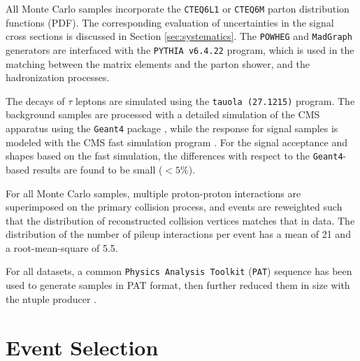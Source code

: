 All Monte Carlo samples incorporate the \texttt{CTEQ6L1} \cite{Pumplin:2002vw} or \texttt{CTEQ6M} \cite{Nadolsky:2008zw} parton distribution functions (PDF). The corresponding evaluation of uncertainties in the signal cross sections is discussed in Section \ref{sec:systematics}. The \texttt{POWHEG} and \texttt{MadGraph} generators are interfaced with the \texttt{PYTHIA v6.4.22} \cite{Sjostrand:2006za} program, which is used in the matching between the matrix elements and the parton shower, and the hadronization processes. 


The decays of $\tau$ leptons are simulated using the \texttt{tauola (27.1215)} \cite{Davidson:2010rw} program. The background samples are processed with a detailed simulation of the CMS apparatus using the \texttt{Geant4} package \cite{Agostinelli:2002hh}, while the response for signal samples is modeled with the CMS fast simulation program \cite{Abdullin:2011zz}. For the signal acceptance and \mjj shapes based on the fast simulation, the differences with respect to the \texttt{Geant4}-based results are found to be small ($< 5\%$). 

For all Monte Carlo samples, multiple proton-proton interactions are superimposed on the primary collision process, and events are reweighted such that the distribution of reconstructed collision vertices matches that in data. The distribution of the number of pileup interactions per event has a mean of 21 and a root-mean-square of 5.5. 

For all datasets, a common \texttt{Physics Analysis Toolkit} (\texttt{PAT}) \cite{Adam:2010zza} sequence has been used to generate samples in PAT format, then further reduced them in size with the ntuple producer \cite{bib:thentuplemaker}.



\section{Event Selection}
\label{sec:eventselection}
\FloatBarrier



